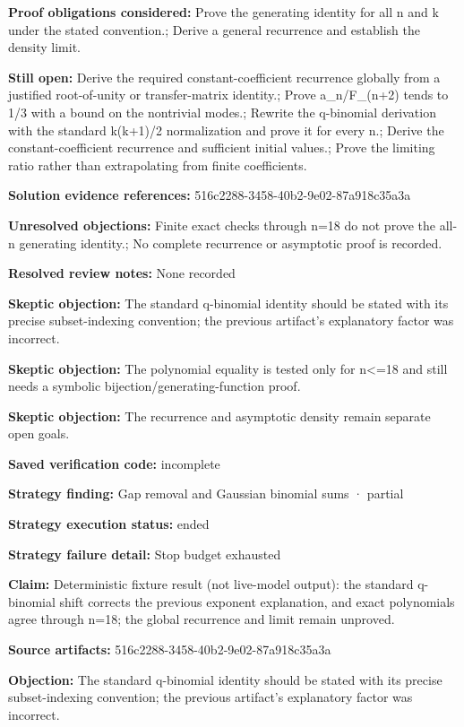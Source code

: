 \documentclass[11pt]{article}
\begin{document}
\textbf{Proof obligations considered:} Prove the generating identity for all n and k under the stated convention.; Derive a general recurrence and establish the density limit.\par
\textbf{Still open:} Derive the required constant-coefficient recurrence globally from a justified root-of-unity or transfer-matrix identity.; Prove a\_n/F\_(n+2) tends to 1/3 with a bound on the nontrivial modes.; Rewrite the q-binomial derivation with the standard k(k+1)/2 normalization and prove it for every n.; Derive the constant-coefficient recurrence and sufficient initial values.; Prove the limiting ratio rather than extrapolating from finite coefficients.\par
\textbf{Solution evidence references:} 516c2288-3458-40b2-9e02-87a918c35a3a\par
\textbf{Unresolved objections:} Finite exact checks through n=18 do not prove the all-n generating identity.; No complete recurrence or asymptotic proof is recorded.\par
\textbf{Resolved review notes:} None recorded\par
\textbf{Skeptic objection:} The standard q-binomial identity should be stated with its precise subset-indexing convention; the previous artifact's explanatory factor was incorrect.\par
\textbf{Skeptic objection:} The polynomial equality is tested only for n\textless{}=18 and still needs a symbolic bijection/generating-function proof.\par
\textbf{Skeptic objection:} The recurrence and asymptotic density remain separate open goals.\par
\textbf{Saved verification code:} incomplete\par
\textbf{Strategy finding:} Gap removal and Gaussian binomial sums · partial\par
\textbf{Strategy execution status:} ended\par
\textbf{Strategy failure detail:} Stop budget exhausted\par
\textbf{Claim:} Deterministic fixture result (not live-model output): the standard q-binomial shift corrects the previous exponent explanation, and exact polynomials agree through n=18; the global recurrence and limit remain unproved.\par
\textbf{Source artifacts:} 516c2288-3458-40b2-9e02-87a918c35a3a\par
\textbf{Objection:} The standard q-binomial identity should be stated with its precise subset-indexing convention; the previous artifact's explanatory factor was incorrect.\par
\end{document}
